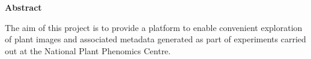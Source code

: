 \thispagestyle{empty}

\begin{center}
    {\LARGE\bf Abstract}
\end{center}

The aim of this project is to provide a platform to enable convenient exploration of plant images and associated metadata generated as part of experiments carried out at the National Plant Phenomics Centre.
